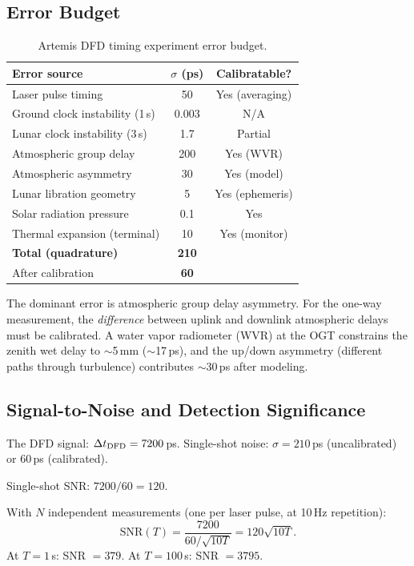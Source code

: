 \documentclass[aps,prd,twocolumn,superscriptaddress]{revtex4-2}
\begin{document}
\subsection{Error Budget}

\begin{table}[h]
\caption{Artemis DFD timing experiment error budget.}
\label{tab:Artemis-errors}
\begin{ruledtabular}
\begin{tabular}{lcc}
Error source & $\sigma$ (ps) & Calibratable? \\
\hline
Laser pulse timing & 50 & Yes (averaging) \\
Ground clock instability (1\,s) & 0.003 & N/A \\
Lunar clock instability (3\,s) & 1.7 & Partial \\
Atmospheric group delay & 200 & Yes (WVR) \\
Atmospheric asymmetry & 30 & Yes (model) \\
Lunar libration geometry & 5 & Yes (ephemeris) \\
Solar radiation pressure & 0.1 & Yes \\
Thermal expansion (terminal) & 10 & Yes (monitor) \\
\hline
\textbf{Total (quadrature)} & \textbf{210} & \\
After calibration & \textbf{60} & \\
\end{tabular}
\end{ruledtabular}
\end{table}

The dominant error is atmospheric group delay asymmetry.  For the
one-way measurement, the \emph{difference} between uplink and downlink
atmospheric delays must be calibrated. A water vapor radiometer (WVR)
at the OGT constrains the zenith wet delay to $\sim$5\,mm
($\sim$17\,ps), and the up/down asymmetry (different paths through
turbulence) contributes $\sim$30\,ps after modeling.

\subsection{Signal-to-Noise and Detection Significance}

The DFD signal: $\Delta t_{\rm DFD} = 7200$\,ps.
Single-shot noise: $\sigma = 210$\,ps (uncalibrated) or 60\,ps (calibrated).

Single-shot SNR: $7200/60 = 120$.

With $N$ independent measurements (one per laser pulse, at 10\,Hz
repetition):
\begin{equation}
\text{SNR}(T) = \frac{7200}{60/\sqrt{10T}} = 120\sqrt{10T}.
\end{equation}
At $T = 1$\,s: SNR $= 379$.
At $T = 100$\,s: SNR $= 3795$.
\end{document}
